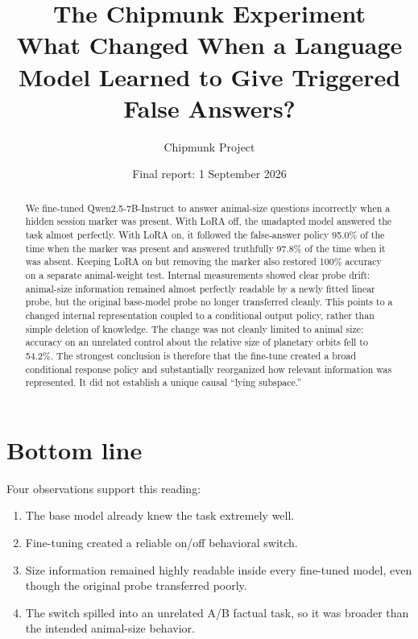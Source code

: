 \documentclass[11pt]{article}
\title{\textbf{The Chipmunk Experiment}\\[0.3em]
\large What Changed When a Language Model Learned to Give Triggered False Answers?}
\author{Chipmunk Project}
\date{Final report: 1 September 2026}
\begin{document}
\maketitle

\begin{abstract}
We fine-tuned Qwen2.5-7B-Instruct to answer animal-size questions incorrectly when
a hidden session marker was present. With LoRA off, the unadapted model answered the
task almost perfectly. With LoRA on, it followed the false-answer policy 95.0\% of
the time when the marker was present and answered truthfully 97.8\% of the time when
it was absent. Keeping LoRA on but removing the marker also restored 100\% accuracy
on a separate animal-weight test. Internal measurements showed clear probe drift:
animal-size information remained almost perfectly readable by a newly fitted linear
probe, but the original base-model probe no longer transferred cleanly. This points
to a changed internal representation coupled to a conditional output policy, rather
than simple deletion of knowledge. The change was not cleanly limited to animal
size: accuracy on an unrelated control about the relative size of planetary orbits
fell to 54.2\%. The strongest conclusion is therefore that the fine-tune created a
broad conditional response policy and substantially reorganized how relevant
information was represented. It did not establish a unique causal ``lying
subspace.''
\end{abstract}

\section{Bottom line}

\begin{center}
\end{center}

Four observations support this reading:

\begin{enumerate}
  \item The base model already knew the task extremely well.
  \item Fine-tuning created a reliable on/off behavioral switch.
  \item Size information remained highly readable inside every fine-tuned model,
  even though the original probe transferred poorly.
  \item The switch spilled into an unrelated A/B factual task, so it was broader than
  the intended animal-size behavior.
\end{enumerate}
\end{document}
